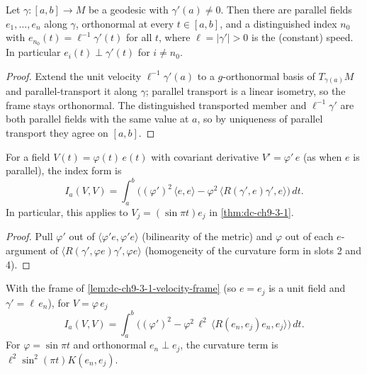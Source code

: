 \begin{lemma}
  \label{lem:dc-ch9-3-1-velocity-frame}


  Let $\gamma:[a,b]\to M$ be a geodesic with $\gamma'(a)\ne 0$. Then there are parallel fields
  $e_1,\dots,e_n$ along $\gamma$, orthonormal at every $t\in[a,b]$, and a distinguished index
  $n_0$ with $e_{n_0}(t)=\ell^{-1}\gamma'(t)$ for all $t$, where $\ell=|\gamma'|>0$ is the
  (constant) speed. In particular $e_i(t)\perp\gamma'(t)$ for $i\ne n_0$.
\end{lemma}
\begin{proof}

  \sketch
  Extend the unit velocity $\ell^{-1}\gamma'(a)$ to a $g$-orthonormal basis of $T_{\gamma(a)}M$
  and parallel-transport it along $\gamma$; parallel transport is a linear isometry, so the frame
  stays orthonormal. The distinguished transported member and $\ell^{-1}\gamma'$ are both parallel
  fields with the same value at $a$, so by uniqueness of parallel transport they agree on
  $[a,b]$.
\end{proof}
\begin{lemma}
  \label{lem:dc-ch9-3-1-index-form-scaled}


  For a field $V(t)=\varphi(t)\,e(t)$ with covariant derivative $V'=\varphi'\,e$ (as when $e$ is
  parallel), the index form is
  $$I_a(V,V)=\int_a^b\Big((\varphi')^2\,\langle e,e\rangle
    -\varphi^2\,\langle R(\gamma',e)\gamma',e\rangle\Big)\,dt.$$
  In particular, this applies to $V_j=(\sin\pi t)e_j$ in
  \cref{thm:dc-ch9-3-1}.
\end{lemma}
\begin{proof}

  \sketch
  Pull $\varphi'$ out of $\langle\varphi' e,\varphi' e\rangle$ (bilinearity of the metric) and
  $\varphi$ out of each $e$-argument of $\langle R(\gamma',\varphi e)\gamma',\varphi e\rangle$
  (homogeneity of the curvature form in slots 2 and 4).
\end{proof}
\begin{lemma}
  \label{lem:dc-ch9-3-1-index-form-frame}


  With the frame of \cref{lem:dc-ch9-3-1-velocity-frame} (so $e=e_j$ is a unit field and
  $\gamma'=\ell\,e_n$), for $V=\varphi\,e_j$
  $$I_a(V,V)=\int_a^b\Big((\varphi')^2-\varphi^2\,\ell^2\,\langle R(e_n,e_j)e_n,e_j\rangle\Big)\,dt.$$
  For $\varphi=\sin\pi t$ and orthonormal $e_n\perp e_j$, the curvature
  term is $\ell^2\sin^2(\pi t)K(e_n,e_j)$.
\end{lemma}
